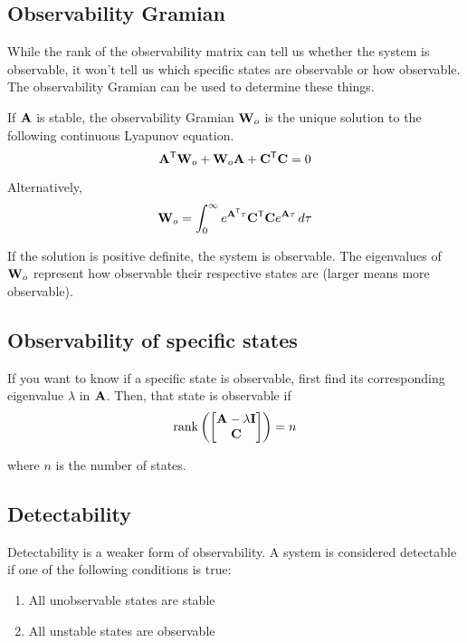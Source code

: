 \subsection{Observability Gramian}

While the rank of the observability matrix can tell us whether the system is
observable, it won't tell us which specific states are observable or how
observable. The observability Gramian can be used to determine these things.

If $\mathbf{A}$ is stable, the observability Gramian $\mathbf{W}_o$ is the unique
solution to the following continuous Lyapunov equation.
\begin{equation}
  \mathbf{A}^\mathsf{T}\mathbf{W}_o + \mathbf{W}_o\mathbf{A} + \mathbf{C}^\mathsf{T}\mathbf{C} = 0
\end{equation}

Alternatively,
\begin{equation}
  \mathbf{W}_o =
    \int_0^\infty e^{\mathbf{A}^\mathsf{T}\tau} \mathbf{C}^\mathsf{T}\mathbf{C} e^{\mathbf{A}\tau} \,d\tau
\end{equation}

If the solution is positive definite, the system is observable. The eigenvalues
of $\mathbf{W}_o$ represent how observable their respective states are (larger
means more observable).

\subsection{Observability of specific states}

If you want to know if a specific state is observable, first find its
corresponding eigenvalue $\lambda$ in $\mathbf{A}$. Then, that state is
observable if
\begin{equation}
  \operatorname{rank}\left(
  \begin{bmatrix}
    \mathbf{A} - \lambda\mathbf{I} \\
    \mathbf{C}
  \end{bmatrix}\right) = n
\end{equation}

where $n$ is the number of \glspl{state}.

\subsection{Detectability}

Detectability is a weaker form of observability. A system is considered
detectable if one of the following conditions is true:
\begin{enumerate}
  \item All unobservable states are stable
  \item All unstable states are observable
\end{enumerate}
